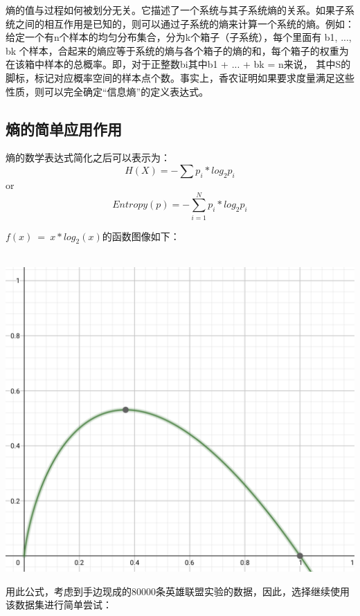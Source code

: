 \documentclass[lang=cn,11pt]{elegantpaper}
\begin{document}
熵的值与过程如何被划分无关。它描述了一个系统与其子系统熵的关系。如果子系统之间的相互作用是已知的，则可以通过子系统的熵来计算一个系统的熵。例如：给定一个有n个样本的均匀分布集合，分为k个箱子（子系统），每个里面有 b1, ..., bk 个样本，合起来的熵应等于系统的熵与各个箱子的熵的和，每个箱子的权重为在该箱中样本的总概率。即，对于正整数bi其中b1 + ... + bk = n来说，
其中S的脚标，标记对应概率空间的样本点个数。事实上，香农证明如果要求度量满足这些性质，则可以完全确定“信息熵”的定义表达式。

\subsection{熵的简单应用作用}
熵的数学表达式简化之后可以表示为：
\begin{equation}
H(X) = -\sum p_i * log_2 p_i\label{eq:binom}
\end{equation}
or
\begin{equation}
Entropy(p) = -\sum_{i=1}^{N} p_i * log_2 p_i\label{eq:binom}
\end{equation}

$f(x)~=~x*log_2(x)$的函数图像如下：
\\~
\begin{center}
\includegraphics[scale=0.5]{logpic.png}\\
\end{center}

用此公式，考虑到手边现成的80000条英雄联盟实验的数据，因此，选择继续使用该数据集进行简单尝试：
\end{document}
